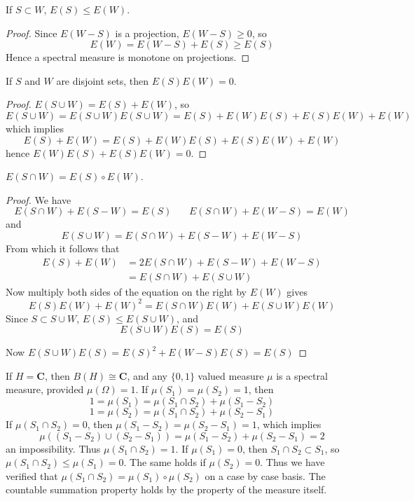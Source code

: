 \begin{lemma}
    If $S \subset W$, $E(S) \leq E(W)$.
\end{lemma}
\begin{proof}
    Since $E(W - S)$ is a projection, $E(W - S) \geq 0$, so
    \[ E(W) = E(W - S) + E(S) \geq E(S) \]
    Hence a spectral measure is monotone on projections.
\end{proof}

\begin{lemma}
    If $S$ and $W$ are disjoint sets, then $E(S)E(W) = 0$.
\end{lemma}
\begin{proof}
    $E(S \cup W) = E(S) + E(W)$, so
    \[ E(S \cup W) = E(S \cup W) E(S \cup W) = E(S) + E(W) E(S) + E(S)E(W) + E(W) \]
    which implies
    \[ E(S) + E(W) = E(S) + E(W) E(S) + E(S) E(W) + E(W) \]
    hence $E(W) E(S) + E(S) E(W) = 0$.
\end{proof}

\begin{lemma}
    $E(S \cap W) = E(S) \circ E(W)$.
\end{lemma}
\begin{proof}
    We have
    \[ E(S \cap W) + E(S - W) = E(S)\ \ \ \ \ \ \ \ E(S \cap W) + E(W - S) = E(W) \]
    and
    \[ E(S \cup W) = E(S \cap W) + E(S - W) + E(W - S) \]
    From which it follows that
    \begin{align*}
        E(S) + E(W) &= 2E(S \cap W) + E(S - W) + E(W - S)\\
        &= E(S \cap W) + E(S \cup W)
    \end{align*}
    Now multiply both sides of the equation on the right by $E(W)$ gives
    \[ E(S) E(W) + E(W)^2 = E(S \cap W) E(W) + E(S \cup W) E(W) \]
    Since $S \subset S \cup W$, $E(S) \leq E(S \cup W)$, and
    \[ E(S \cup W) E(S) = E(S) \]

    Now $E(S \cup W) E(S) = E(S)^2 + E(W - S) E(S) = E(S)$
\end{proof}

\begin{example}
    If $H = \mathbf{C}$, then $B(H) \cong \mathbf{C}$, and any $\{ 0, 1 \}$ valued measure $\mu$ is a spectral measure, provided $\mu(\Omega) = 1$. If $\mu(S_1) = \mu(S_2) = 1$, then
    \[ 1 = \mu(S_1) = \mu(S_1 \cap S_2) + \mu(S_1 - S_2) \]
    \[ 1 = \mu(S_2) = \mu(S_1 \cap S_2) + \mu(S_2 - S_1) \]
    If $\mu(S_1 \cap S_2) = 0$, then $\mu(S_1 - S_2) = \mu(S_2 - S_1) = 1$, which implies
    \[ \mu((S_1 - S_2) \cup (S_2 - S_1)) = \mu(S_1 - S_2) + \mu(S_2 - S_1) = 2 \]
    an impossibility. Thus $\mu(S_1 \cap S_2) = 1$. If $\mu(S_1) = 0$, then $S_1 \cap S_2 \subset S_1$, so $\mu(S_1 \cap S_2) \leq \mu(S_1) = 0$. The same holds if $\mu(S_2) = 0$. Thus we have verified that $\mu(S_1 \cap S_2) = \mu(S_1) \circ \mu(S_2)$ on a case by case basis. The countable summation property holds by the property of the measure itself.
\end{example}

